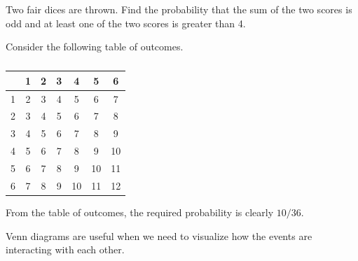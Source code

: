 \begin{sample}
    Two fair dices are thrown. Find the probability that the sum of the two scores is odd and at least one of the two scores is greater than 4.
\end{sample}
\begin{sampans}
    Consider the following table of outcomes.
    \begin{table}[H]
        \centering
        \begin{tabular}{|c|c|c|c|c|c|c|}
            \hline  & 1 & 2 & 3 & 4 & 5 & 6\\\hline
            1 & 2 & 3 & 4 & 5 & 6 & \cellcolor{ForestGreen!20}7 \\ \hline
            2 & 3 & 4 & 5 & 6 & \cellcolor{ForestGreen!20}7 & 8 \\ \hline
            3 & 4 & 5 & 6 & 7 & 8 & \cellcolor{ForestGreen!20}9 \\ \hline
            4 & 5 & 6 & 7 & 8 & \cellcolor{ForestGreen!20}9 & 10 \\ \hline
            5 & 6 & \cellcolor{ForestGreen!20}7 & 8 & \cellcolor{ForestGreen!20}9 & 10 & \cellcolor{ForestGreen!20}11 \\ \hline
            6 & \cellcolor{ForestGreen!20}7 & 8 & \cellcolor{ForestGreen!20}9 & 10 & \cellcolor{ForestGreen!20}11 & 12 \\ \hline
        \end{tabular}
        \caption{}
    \end{table}
    From the table of outcomes, the required probability is clearly $10/36$.
\end{sampans}

\begin{recipe}
    Venn diagrams are useful when we need to visualize how the events are interacting with each other.
\end{recipe}

